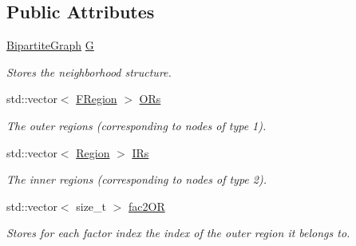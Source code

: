 \subsection*{Public Attributes}
\begin{CompactItemize}
\item 
\hypertarget{classdai_1_1RegionGraph_baca33a49ccbcb787c3d459398b47047}{
\hyperlink{classdai_1_1BipartiteGraph}{BipartiteGraph} \hyperlink{classdai_1_1RegionGraph_baca33a49ccbcb787c3d459398b47047}{G}}
\label{classdai_1_1RegionGraph_baca33a49ccbcb787c3d459398b47047}

\begin{CompactList}\small\item\em Stores the neighborhood structure. \item\end{CompactList}\item 
\hypertarget{classdai_1_1RegionGraph_5c94c84a601c9b29cfe75da8562dfed8}{
std::vector$<$ \hyperlink{classdai_1_1FRegion}{FRegion} $>$ \hyperlink{classdai_1_1RegionGraph_5c94c84a601c9b29cfe75da8562dfed8}{ORs}}
\label{classdai_1_1RegionGraph_5c94c84a601c9b29cfe75da8562dfed8}

\begin{CompactList}\small\item\em The outer regions (corresponding to nodes of type 1). \item\end{CompactList}\item 
\hypertarget{classdai_1_1RegionGraph_e3c3173e62a9f2d8c321d71795706e1c}{
std::vector$<$ \hyperlink{classdai_1_1Region}{Region} $>$ \hyperlink{classdai_1_1RegionGraph_e3c3173e62a9f2d8c321d71795706e1c}{IRs}}
\label{classdai_1_1RegionGraph_e3c3173e62a9f2d8c321d71795706e1c}

\begin{CompactList}\small\item\em The inner regions (corresponding to nodes of type 2). \item\end{CompactList}\item 
\hypertarget{classdai_1_1RegionGraph_bb37df8c81a75b76e20eb708563e3d0e}{
std::vector$<$ size\_\-t $>$ \hyperlink{classdai_1_1RegionGraph_bb37df8c81a75b76e20eb708563e3d0e}{fac2OR}}
\label{classdai_1_1RegionGraph_bb37df8c81a75b76e20eb708563e3d0e}

\begin{CompactList}\small\item\em Stores for each factor index the index of the outer region it belongs to. \item\end{CompactList}\end{CompactItemize}
